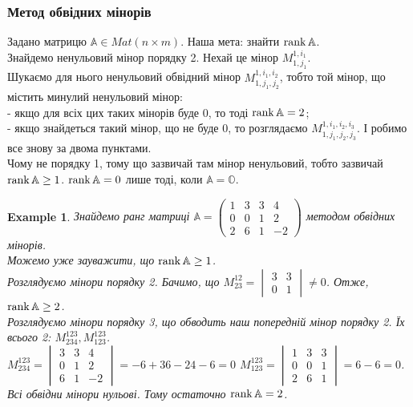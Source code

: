 \documentclass[a4paper, 10pt]{article}
\theoremstyle{theoremdd}
\newtheorem{example}[theorem]{Example}
\begin{document}
\subsubsection*{Метод обвідних мінорів}
Задано матрицю $\mathbb{A} \in Mat(n \times m)$. Наша мета: знайти $\rank \mathbb{A}$.\\
Знайдемо ненульовий мінор порядку 2. Нехай це мінор $M_{1,j_1}^{1,i_1}$.\\
Шукаємо для нього ненульовий обвідний мінор $M_{1,j_1,j_2}^{1,i_1,i_2}$, тобто той мінор, що містить минулий ненульовий мінор:\\
- якщо для всіх цих таких мінорів буде 0, то тоді $\rank \mathbb{A} = 2$;\\
- якщо знайдеться такий мінор, що не буде 0, то розглядаємо $M_{1,j_1,j_2,j_3}^{1,i_1,i_2,i_3}$. І робимо все знову за двома пунктами.
\bigskip \\
Чому не порядку 1, тому що зазвичай там мінор ненульовий, тобто зазвичай $\rank \mathbb{A} \geq 1$. $\rank \mathbb{A} = 0$ лише тоді, коли $\mathbb{A} = \mathbb{O}$.

\begin{example}
Знайдемо ранг матриці $\mathbb{A} = \begin{pmatrix}
1 & 3 & 3 & 4 \\
0 & 0 & 1 & 2 \\
2 & 6 & 1 & -2
\end{pmatrix}$ методом обвідних мінорів.\\
Можемо уже зауважити, що $\rank \mathbb{A} \geq 1$. \\
Розглядуємо мінори порядку 2. Бачимо, що $M^{12}_{23} = \begin{vmatrix}
3 & 3 \\
0 & 1
\end{vmatrix} \neq 0$. Отже, $\rank \mathbb{A} \geq 2$. \\
Розглядуємо мінори порядку 3, що обводить наш попередній мінор порядку 2. Їх всього 2: $M^{123}_{234},M^{123}_{123}$.\\
$M^{123}_{234} = \begin{vmatrix}
3 & 3 & 4 \\
0 & 1 & 2 \\
6 & 1 & -2
\end{vmatrix} = -6+36-24-6 = 0$ \hspace{1cm} $M^{123}_{123} = \begin{vmatrix}
1 & 3 & 3 \\
0 & 0 & 1 \\
2 & 6 & 1
\end{vmatrix} = 6 - 6 = 0$.\\
Всі обвідни мінори нульові. Тому остаточно $\rank \mathbb{A} = 2$.
\end{example}
\end{document}
